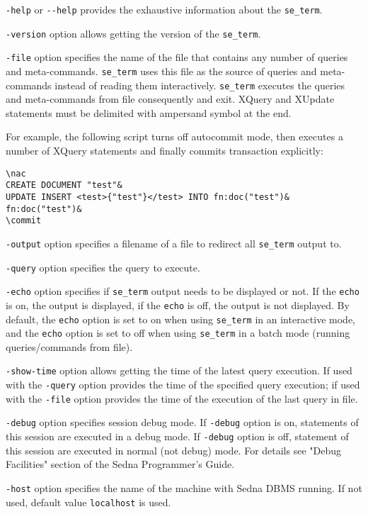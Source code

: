 \documentclass[a4paper,12pt]{article}
\begin{document}
\verb!-help! or \verb!--help! provides the exhaustive information about the
\verb!se_term!.

\verb!-version! option allows getting the version of the \verb!se_term!.

\verb!-file! option specifies the name of the file that contains any number of
queries and meta-commands. \verb!se_term! uses this file as the source of
queries and meta-commands instead of reading them interactively. \verb!se_term!
executes the queries and meta-commands from file consequently and exit. XQuery
and XUpdate statements must be delimited with ampersand symbol at the end.

For example, the following script turns off autocommit mode, then executes a
number of XQuery statements and finally commits transaction explicitly:

\small{
\begin{verbatim}
\nac
CREATE DOCUMENT "test"&
UPDATE INSERT <test>{"test"}</test> INTO fn:doc("test")&
fn:doc("test")&
\commit
\end{verbatim}}

\verb!-output! option specifies a filename of a file to redirect all
\verb!se_term! output to.

\verb!-query! option specifies the query to execute.

\verb!-echo! option specifies if \verb!se_term! output needs to be displayed or
not. If the \verb!echo! is on, the output is displayed, if the \verb!echo! is
off, the output is not displayed. By default, the \verb!echo! option is set to
on when using \verb!se_term! in an interactive mode, and the \verb!echo! option
is set to off when using \verb!se_term! in a batch mode (running
queries/commands from file).

\verb!-show-time! option allows getting the time of the latest query execution.
If used with the \verb!-query! option provides the time of the specified query
execution; if used with the \verb!-file! option provides the time of the
execution of the last query in file.

\verb!-debug! option specifies session debug mode. If \verb!-debug! option is
on, statements of this session are executed in a debug mode. If \verb!-debug!
option is off, statement of this session are executed in normal (not debug)
mode. For details see "Debug Facilities" section of the Sedna Programmer's
Guide.

\verb!-host! option specifies the name of the machine with Sedna DBMS running.
If not used, default value \verb!localhost! is used.
\end{document}
